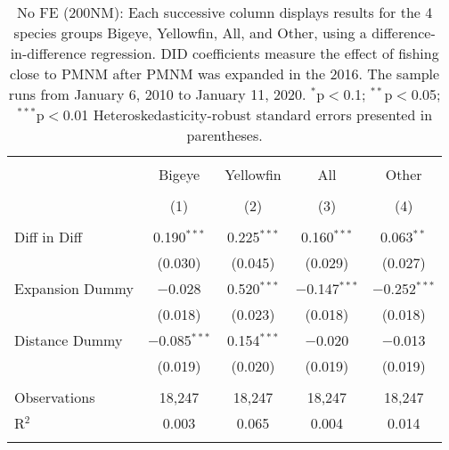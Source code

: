 
\begin{table}[!htbp] \centering 
  \caption{No FE (200NM): Each successive column displays results for the 4 species groups Bigeye, Yellowfin, All, and Other, using a difference-in-difference regression. DID coefficients measure the effect of fishing close to PMNM after PMNM was expanded in the 2016. The sample runs from January 6, 2010 to January 11, 2020. $^{*}$p$<$0.1; $^{**}$p$<$0.05; $^{***}$p$<$0.01 Heteroskedasticity-robust standard errors presented in parentheses.} 
  \label{tbl:noFE200NM} 
\begin{tabular}{@{\extracolsep{5pt}}lcccc} 
\\[-1.8ex]\hline 
\hline \\[-1.8ex] 
 & Bigeye & Yellowfin & All & Other \\ 
\\[-1.8ex] & (1) & (2) & (3) & (4)\\ 
\hline \\[-1.8ex] 
 Diff in Diff & 0.190$^{***}$ & 0.225$^{***}$ & 0.160$^{***}$ & 0.063$^{**}$ \\ 
  & (0.030) & (0.045) & (0.029) & (0.027) \\ 
  Expansion Dummy & $-$0.028 & 0.520$^{***}$ & $-$0.147$^{***}$ & $-$0.252$^{***}$ \\ 
  & (0.018) & (0.023) & (0.018) & (0.018) \\ 
  Distance Dummy & $-$0.085$^{***}$ & 0.154$^{***}$ & $-$0.020 & $-$0.013 \\ 
  & (0.019) & (0.020) & (0.019) & (0.019) \\ 
 \hline \\[-1.8ex] 
Observations & 18,247 & 18,247 & 18,247 & 18,247 \\ 
R$^{2}$ & 0.003 & 0.065 & 0.004 & 0.014 \\ 
\hline 
\hline \\[-1.8ex] 
\end{tabular} 
\end{table} 
